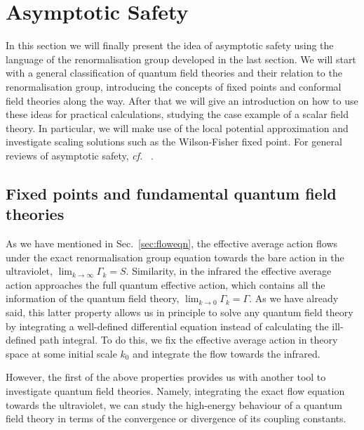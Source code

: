 \documentclass[11pt]{book}
\newcommand\cf{\textit{cf.}\ }
\numberwithin{equation}{chapter}
\begin{document}
\section{Asymptotic Safety}

In this section we will finally present the idea of asymptotic safety
using the language of the renormalisation group developed in the last
section. We will start with a general classification of quantum
field theories and their relation to the renormalisation group,
introducing the concepts of fixed points and conformal field
theories along the way. After that we will give an introduction
on how to use these ideas for practical calculations, studying
the case example of a scalar field theory. In particular,
we will make use of the local potential approximation and
investigate scaling solutions such as the Wilson-Fisher fixed point.
For general reviews of asymptotic safety, \cf
\cite{
  Niedermaier:2006wt,
  Niedermaier:2006ns,
  Litim:2008tt,
  Litim:2011cp,
  Percacci:2007sz,
  Reuter:2012id,
  Reuter:2012xf,
  Nagy:2012ef
}.


\subsection{Fixed points and fundamental quantum field theories}

As we have mentioned in Sec.~\ref{sec:floweqn}, the effective
average action flows under the exact renormalisation group equation
towards the bare action in the ultraviolet,
$\lim_{k \rightarrow \infty} \Gamma_k = S$. Similarity, in the infrared
the effective average action approaches the full quantum effective
action, which contains all the information of the quantum field theory,
$\lim_{k \rightarrow 0} \Gamma_k = \Gamma$. As we have already said,
this latter property allows us in principle to solve any
quantum field theory by
integrating a well-defined differential equation instead of
calculating the ill-defined path integral. To do this, we fix
the effective average action in theory space at some initial scale $k_0$
and integrate the flow towards the infrared.

However, the first of the above properties provides us with another
tool to investigate quantum field theories. Namely, integrating
the exact flow equation towards the ultraviolet, we can study
the high-energy behaviour of a quantum field theory in terms of
the convergence or divergence of its coupling constants.
\end{document}
